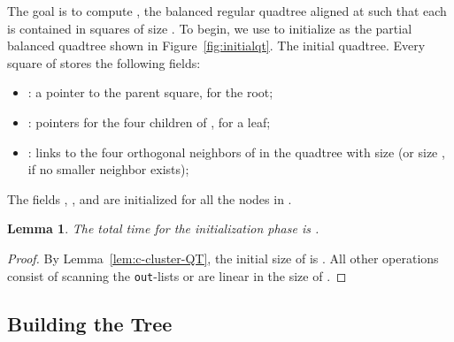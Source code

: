 \documentclass[11pt]{paper}
\newtheorem {lem}[theorem] {Lemma}
\begin{document}
The goal is to compute , the balanced regular quadtree aligned at 
 such that each  is contained in squares of size .
To begin, we use  to initialize  as the partial 
balanced quadtree  shown in Figure~\ref{fig:initialqt}.
 {The initial quadtree.}
Every square  of  stores the following fields:
\begin{itemize}
\item : a pointer to the parent square,  for
       the root;
\item : pointers for the four children of ,
      for a leaf;
\item : links to the four orthogonal neighbors of 
      in the quadtree  with size 
      (or size , if no smaller neighbor exists);
\end{itemize}

The fields , , and 
are initialized for all the nodes in .

\begin{lem}\label{lem:node-init}
The total time for the initialization phase is
\emph{}.
\end{lem}

\begin{proof}
By Lemma~\ref{lem:c-cluster-QT}, the initial size of  is .
All other operations consist of scanning the \texttt{out}-lists
or are linear in the size of .
\end{proof}

\subsection {Building the Tree }
\end{document}
